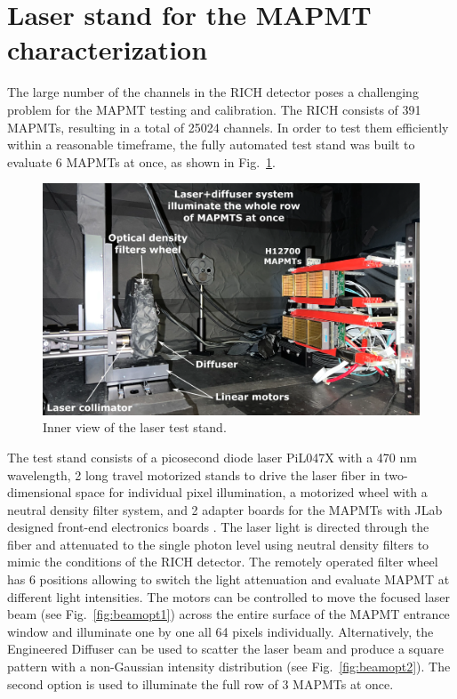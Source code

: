 
\section{Laser stand for the MAPMT characterization}
The large number of the channels in the RICH detector  poses a challenging problem for the MAPMT testing and calibration.
The RICH consists of 391 MAPMTs, resulting in a total of 25024 channels. In order to test them efficiently within a reasonable timeframe, the fully automated test stand was built to evaluate 6 MAPMTs at once, as shown in Fig.~\ref{fig:MAPMTtest}.

\begin{figure}[hbt]
	\centering
	\includegraphics[width=0.95\linewidth]{figures/LaserSetup.png}
	\caption{Inner view of the laser test stand.}
	\label{fig:MAPMTtest}
\end{figure}

The test stand consists of a picosecond diode  laser PiL047X with a 470 nm wavelength, 2 long travel motorized stands to drive the laser fiber in two-dimensional space for individual pixel illumination, a motorized wheel with a neutral density filter system, and 2 adapter boards for the MAPMTs with JLab designed front-end electronics boards \cite{Contalbrigo:2020}.
The laser light is directed through the fiber and attenuated to the single photon level using neutral density filters to mimic the conditions of the RICH detector.
The remotely operated filter wheel has 6 positions allowing to switch the light attenuation and evaluate MAPMT at different light intensities.
The motors can be controlled to move the focused laser beam (see Fig.~\ref{fig:beamopt1}) across the entire surface of the MAPMT entrance window and illuminate one by one all 64 pixels individually.
Alternatively, the Engineered Diffuser can be used to scatter the laser beam and produce a square pattern with a non-Gaussian intensity distribution (see Fig.~\ref{fig:beamopt2}). 
The second option is used to illuminate the full row of 3 MAPMTs at once.

